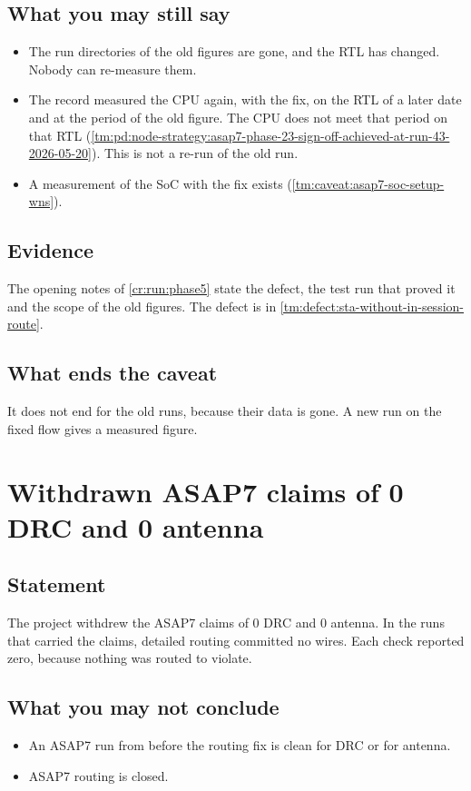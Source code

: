 \subsection*{What you may still say}
\begin{itemize}
  \item The run directories of the old figures are gone, and the RTL has changed. Nobody can re-measure them.
  \item The record measured the CPU again, with the fix, on the RTL of a later date and at the period of the old figure. The CPU does not meet that period on that RTL (\cref{tm:pd:node-strategy:asap7-phase-23-sign-off-achieved-at-run-43-2026-05-20}). This is not a re-run of the old run.
  \item A measurement of the SoC with the fix exists (\cref{tm:caveat:asap7-soc-setup-wns}).
\end{itemize}

\subsection*{Evidence}
The opening notes of \cref{cr:run:phase5} state the defect, the test run that proved it and the scope of the old figures. The defect is in \cref{tm:defect:sta-without-in-session-route}.

\subsection*{What ends the caveat}
It does not end for the old runs, because their data is gone. A new run on the fixed flow gives a measured figure.

\section{Withdrawn ASAP7 claims of 0 DRC and 0 antenna}\label{tm:caveat:asap7-drc-antenna-withdrawn}
\subsection*{Statement}
The project withdrew the ASAP7 claims of 0 DRC and 0 antenna. In the runs that carried the claims, detailed routing committed no wires. Each check reported zero, because nothing was routed to violate.

\subsection*{What you may not conclude}
\begin{itemize}
  \item An ASAP7 run from before the routing fix is clean for DRC or for antenna.
  \item ASAP7 routing is closed.
\end{itemize}

